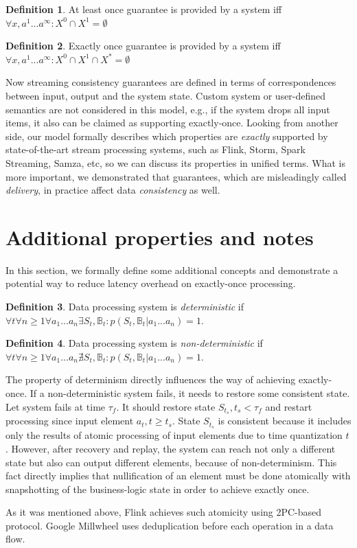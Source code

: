 \documentclass[sigconf]{acmart}
\theoremstyle{definition}
\newtheorem{definition}{Definition}
\begin{document}
\begin{definition}{At least once}
guarantee is provided by a system iff $\forall{x,a^{1}...a^\infty}:X^{0}\cap{X^{1}}=\emptyset$
\end{definition}

\begin{definition}{Exactly once}
guarantee is provided by a system iff $\forall{x,a^{1}...a^\infty}:X^{0}\cap{X^{1}}\cap{X^{*}}=\emptyset$
\end{definition}

Now streaming consistency guarantees are defined in terms of correspondences between input, output and the system state. Custom system or user-defined semantics are not considered in this model, e.g., if the system drops all input items, it also can be claimed as supporting exactly-once. Looking from another side, our model formally describes which properties are {\em exactly} supported by state-of-the-art stream processing systems, such as Flink, Storm, Spark Streaming, Samza, etc, so we can discuss its properties in unified terms. What is more important, we demonstrated that guarantees, which are misleadingly called {\em delivery}, in practice affect data {\em consistency} as well.

\section{Additional properties and notes}
 
In this section, we formally define some additional concepts and demonstrate a potential way to reduce latency overhead on exactly-once processing.

\begin{definition}{Data processing system is {\em deterministic}}
if \\
$\forall{t} \forall{n\geq1} \forall{a_1...a_n}\exists{S_t,\mathbb{B}_t}:p(S_t,\mathbb{B}_t|a_1...a_n)=1$.
\end{definition}

\begin{definition}{Data processing system is {\em non-deterministic}}
if \\
$\forall{t} \forall{n\geq1} \forall{a_1...a_n}\nexists{S_t,\mathbb{B}_t}:p(S_t,\mathbb{B}_t|a_1...a_n)=1$.
\end{definition}

The property of determinism directly influences the way of achieving exactly-once. If a non-deterministic system fails, it needs to restore some consistent state. Let system fails at time $\tau_f$. It should restore state $S_{t_s}, t_s < \tau_f$ and restart processing since input element $a_t, t\geq{t_s}$. State $S_{t_s}$ is consistent because it includes only the results of atomic processing of input elements due to time quantization $t$. However, after recovery and replay, the system can reach not only a different state but also can output different elements, because of non-determinism. This fact directly implies that nullification of an element must be done atomically with snapshotting of the business-logic state in order to achieve exactly once.

As it was mentioned above, Flink achieves such atomicity using 2PC-based protocol. Google Millwheel uses deduplication before each operation in a data flow.



\end{document}
